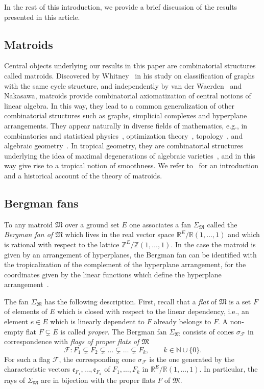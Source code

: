 \documentclass[11pt]{amsart}
\theoremstyle{definition}
\numberwithin{equation}{section}
\newcommand{\ie}{i.e.}
\renewcommand{\~}{\widetilde}
\newcommand{\Z}{\mathbb{Z}}
\newcommand{\R}{\mathbb{R}}
\newcommand{\rquot}[2]{#1\big/#2}
\newcommand{\e}{{\mathfrak e}} %
\newcommand{\Ma}{\mathfrak M} %
\newcommand{\Fl}{\mathscr{F}}
\begin{document}
\medskip

In the rest of this introduction, we provide a brief discussion of the results presented in this article.



\subsection{Matroids} Central objects underlying our results in this paper are combinatorial structures called matroids. Discovered by Whitney~\cite{Whitney} in his study on classification of graphs with the same cycle structure, and independently by van der Waerden~\cite{vdw} and Nakasawa, matroids provide combinatorial axiomatization of central notions of linear algebra. In this way, they lead to a common generalization of other combinatorial structures such as graphs, simplicial complexes and hyperplane arrangements. They appear naturally in diverse fields of mathematics, e.g., in combinatorics and statistical physics~\cites{Tutte, MirPer, GGW, SS14, Piquerez}, optimization theory~\cite{schrijver}, topology~\cites{Mac91, GM92}, and algebraic geometry~\cites{Mnev, Laf, BB, BL,sturmfels}. In tropical geometry, they are combinatorial structures underlying the idea of maximal degenerations of algebraic varieties~\cites{deligne-md, KS}, and in this way give rise to a tropical notion of smoothness. We refer to~\cites{wilson, kung, Oxl11} for an introduction and a historical account of the theory of matroids.



\subsection{Bergman fans} To any matroid $\Ma$ over a ground set $E$ one associates a fan $\Sigma_\Ma$ called the \emph{Bergman fan of $\Ma$} which lives in the real vector space $\rquot{\R^E}{\R (1,\dots, 1)}$ and which is rational with respect to the lattice $\rquot{\Z^E}{\Z(1, \dots, 1)}$. In the case the matroid is given by an arrangement of hyperplanes, the Bergman fan can be identified with the tropicalization of the complement of the hyperplane arrangement, for the coordinates given by the linear functions which define the hyperplane arrangement~\cite{AK}.

The fan $\Sigma_\Ma$ has the following description. First, recall that a \emph{flat} of $\Ma$ is a set $F$ of elements of $E$ which is closed with respect to the linear dependency, \ie, an element $e\in E$ which is linearly dependent to $F$ already belongs to $F$. A non-empty flat $F \subsetneq E$  is called \emph{proper}. The Bergman fan $\Sigma_\Ma$ consists of cones $\sigma_\Fl$ in correspondence with \emph{flags of proper flats of $\Ma$}
\[\Fl\colon F_1 \subsetneq F_2 \subsetneq \dots \subsetneq \dots \subsetneq F_k, \qquad k \in \mathbb N \cup \{0\}. \]
For such a flag $\Fl$, the corresponding cone $\sigma_\Fl$ is the one generated by the characteristic vectors $\e_{F_1}, \dots, \e_{F_k}$ of $F_1, \dots, F_k$ in $\R^E / \R(1, \dots, 1)$.  In particular, the rays of $\Sigma_\Ma$ are in bijection with the proper flats $F$ of $\Ma$.
\end{document}
